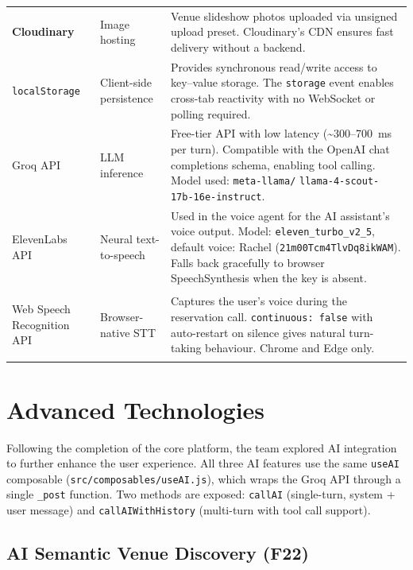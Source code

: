 \documentclass[12pt,a4paper,oneside]{report}
\begin{document}
\begin{longtable}{>{\bfseries}L{3.8cm} L{3.2cm} L{5.5cm}}
  Cloudinary &
    Image hosting &
    Venue slideshow photos uploaded via unsigned upload preset.
    Cloudinary's CDN ensures fast delivery without a backend. \\
  \addlinespace

  \texttt{localStorage} &
    Client-side persistence &
    Provides synchronous read/write access to key--value storage.
    The \texttt{storage} event enables cross-tab reactivity with no
    WebSocket or polling required. \\
  \addlinespace

  Groq API &
    LLM inference &
    Free-tier API with low latency (\textasciitilde{}300--700~ms per turn).
    Compatible with the OpenAI chat completions schema, enabling tool
    calling. Model used: \texttt{meta-llama/} \texttt{llama-4-scout-17b-16e-instruct}. \\
  \addlinespace

  ElevenLabs API &
    Neural text-to-speech &
    Used in the voice agent for the AI assistant's voice output.
    Model: \texttt{eleven\_turbo\_v2\_5}, default voice: Rachel
    (\texttt{21m00Tcm4TlvDq8ikWAM}).
    Falls back gracefully to browser SpeechSynthesis when the key
    is absent. \\
  \addlinespace

  Web Speech Recognition API &
    Browser-native STT &
    Captures the user's voice during the reservation call.
    \texttt{continuous: false} with auto-restart on silence gives natural
    turn-taking behaviour. Chrome and Edge only. \\

\end{longtable}

\section{Advanced Technologies}

Following the completion of the core platform, the team explored AI integration
to further enhance the user experience. All three AI features use the same
\texttt{useAI} composable (\texttt{src/composables/useAI.js}), which wraps the
Groq API through a single \texttt{\_post} function. Two methods are exposed:
\texttt{callAI} (single-turn, system + user message) and
\texttt{callAIWithHistory} (multi-turn with tool call support).

\subsection{AI Semantic Venue Discovery (F22)}
\end{document}
